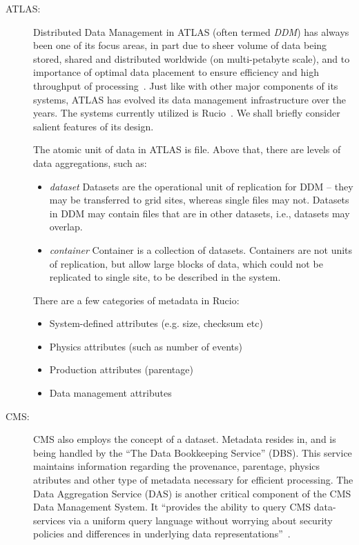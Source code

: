 \begin{description}
\item[ATLAS:] Distributed Data Management in ATLAS (often termed \textit{DDM}) has always been one of its focus areas, in part due to sheer volume of
data being stored, shared and distributed worldwide (on multi-petabyte scale), and to importance of optimal data placement to ensure efficiency
and high throughput of processing~\cite{atlas_ddm_chep12}. Just like with other major components of its systems, ATLAS has evolved its
data management infrastructure over the years. The systems currently utilized is Rucio~\cite{rucio_chep13}. We shall briefly consider salient features of its design.

The atomic unit of data in ATLAS is file. Above that, there are levels of data aggregations, such as:
\begin{itemize}
\item \textit{dataset} Datasets are the operational unit of replication for DDM – they may be transferred to grid sites, whereas single files
may not. Datasets in DDM may contain files that are in other datasets, i.e., datasets may overlap.
\item \textit{container} Container is a collection of datasets. Containers are not units of replication, but allow
large blocks of data, which could not be replicated to single site, to be described in the system.
\end{itemize}

There are a few categories of metadata in Rucio:
\begin{itemize}
\item  System-defined attributes (e.g. size, checksum etc)
\item Physics attributes (such as number of events)
\item Production attributes (parentage)
\item Data management attributes
\end{itemize}

\item[CMS:] CMS also employs the concept of a dataset. Metadata resides in, and is being handled by the ``The Data Bookkeeping Service'' (DBS).
This service maintains information regarding the provenance, parentage, physics atributes and other type of metadata necessary for efficient processing.
The Data Aggregation Service (DAS)  is another critical component of the CMS Data Management System. It ``provides the ability to query CMS data-services via
a uniform query language without worrying about security policies and differences in underlying data representations''~\cite{phedex_chep13}.

\end{description}

